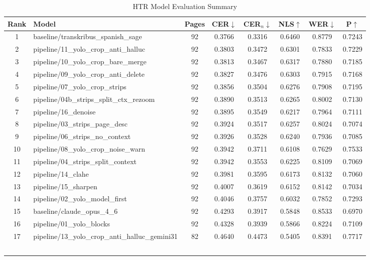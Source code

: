 \begin{table}[htbp]
\centering
\caption{HTR Model Evaluation Summary}
\label{tab:htr-summary}
\begin{tabular}{clcccccc}
\toprule
Rank & Model & Pages & CER$\downarrow$ & CER$_n$$\downarrow$ & NLS$\uparrow$ & WER$\downarrow$ & P$\uparrow$ \\
\midrule
  1 & baseline/transkribus\_spanish\_sage & 92 & 0.3766 & 0.3316 & 0.6460 & 0.8779 & 0.7243 \\
  2 & pipeline/11\_yolo\_crop\_anti\_halluc & 92 & 0.3803 & 0.3472 & 0.6301 & 0.7833 & 0.7229 \\
  3 & pipeline/10\_yolo\_crop\_bare\_merge & 92 & 0.3813 & 0.3467 & 0.6317 & 0.7880 & 0.7185 \\
  4 & pipeline/09\_yolo\_crop\_anti\_delete & 92 & 0.3827 & 0.3476 & 0.6303 & 0.7915 & 0.7168 \\
  5 & pipeline/07\_yolo\_crop\_strips & 92 & 0.3856 & 0.3504 & 0.6276 & 0.7908 & 0.7195 \\
  6 & pipeline/04b\_strips\_split\_ctx\_rezoom & 92 & 0.3890 & 0.3513 & 0.6265 & 0.8002 & 0.7130 \\
  7 & pipeline/16\_denoise & 92 & 0.3895 & 0.3549 & 0.6217 & 0.7964 & 0.7111 \\
  8 & pipeline/03\_strips\_page\_desc & 92 & 0.3924 & 0.3517 & 0.6257 & 0.8024 & 0.7074 \\
  9 & pipeline/06\_strips\_no\_context & 92 & 0.3926 & 0.3528 & 0.6240 & 0.7936 & 0.7085 \\
  10 & pipeline/08\_yolo\_crop\_noise\_warn & 92 & 0.3942 & 0.3711 & 0.6108 & 0.7629 & 0.7533 \\
  11 & pipeline/04\_strips\_split\_context & 92 & 0.3942 & 0.3553 & 0.6225 & 0.8109 & 0.7069 \\
  12 & pipeline/14\_clahe & 92 & 0.3981 & 0.3595 & 0.6173 & 0.8132 & 0.7060 \\
  13 & pipeline/15\_sharpen & 92 & 0.4007 & 0.3619 & 0.6152 & 0.8142 & 0.7034 \\
  14 & pipeline/02\_yolo\_model\_first & 92 & 0.4046 & 0.3757 & 0.6032 & 0.7852 & 0.7293 \\
  15 & baseline/claude\_opus\_4\_6 & 92 & 0.4293 & 0.3917 & 0.5848 & 0.8533 & 0.6970 \\
  16 & pipeline/01\_yolo\_blocks & 92 & 0.4328 & 0.3939 & 0.5866 & 0.8224 & 0.7109 \\
  17 & pipeline/13\_yolo\_crop\_anti\_halluc\_gemini31 & 82 & 0.4640 & 0.4473 & 0.5405 & 0.8391 & 0.7717 \\
$$
\end{tabular}
\end{table}
